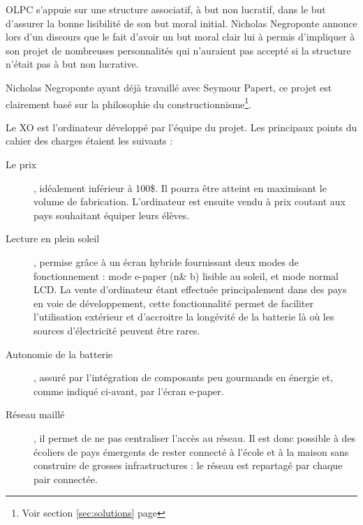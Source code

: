 OLPC s'appuie sur une structure associatif, à but non lucratif, dans le but d'assurer la bonne lisibilité de son but moral initial. Nicholas Negroponte annonce lors d'un discours \cite{ted_olpc_2008} que le fait d'avoir un but moral clair lui à permis d'impliquer à son projet de nombreuses personnalités qui n'auraient pas accepté si la structure n'était pas à but non lucrative.

Nicholas Negroponte ayant déjà travaillé avec Seymour Papert, ce projet est clairement basé sur la philosophie du constructionnisme\footnote{Voir section \ref{sec:solutions} page \pageref{sec:solutions}}.

Le XO est l'ordinateur développé par l'équipe du projet. Les principaux points du cahier des charges étaient les suivants : 

\begin{description}
  \item [Le prix], idéalement inférieur à 100\$. Il pourra être atteint en maximisant le volume de fabrication. L'ordinateur est ensuite vendu à prix coutant aux pays souhaitant équiper leurs élèves.
  \item [Lecture en plein soleil], permise grâce à un écran hybride fournissant deux modes de fonctionnement : mode e-paper (n\& b) lisible au soleil, et mode normal LCD. La vente d'ordinateur étant effectuée principalement dans des pays en voie de développement, cette fonctionnalité permet de faciliter l'utilisation extérieur et d'accroitre la longévité de la batterie là où les sources d'électricité peuvent être rares.
  \item [Autonomie de la batterie], assuré par l'intégration de composants peu gourmands en énergie et, comme indiqué ci-avant, par l'écran e-paper.
  \item [Réseau maillé], il permet de ne pas centraliser l'accès au réseau. Il est donc possible à des écoliers de pays émergents de rester connecté à l'école et à la maison sans construire de grosses infrastructures : le réseau est repartagé par chaque pair connectée.
\end{description}

